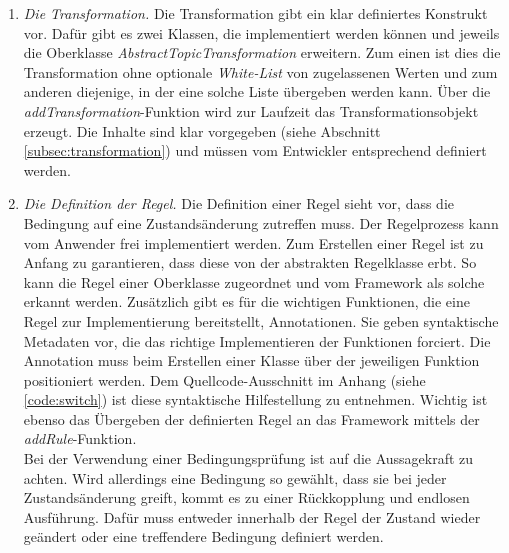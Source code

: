 \begin{enumerate}
            \pagebreak
            \item \textit{Die Transformation.}
            Die Transformation gibt ein klar definiertes Konstrukt vor. Dafür gibt es zwei Klassen, die implementiert werden können und 
            jeweils die Oberklasse \textit{AbstractTopicTransformation} erweitern. Zum einen ist dies die Transformation ohne 
            optionale \textit{White-List} von zugelassenen Werten und zum anderen diejenige, in der eine solche Liste übergeben werden kann. Über die 
            \textit{addTransformation}-Funktion wird zur Laufzeit das Transformationsobjekt erzeugt. Die Inhalte sind klar vorgegeben (siehe Abschnitt \ref{subsec:transformation}) 
            und müssen vom Entwickler entsprechend definiert werden.
            \item \textit{Die Definition der Regel.} 
            Die Definition einer Regel sieht vor, dass die Bedingung auf eine Zustandsänderung zutreffen muss. Der Regelprozess kann vom Anwender 
            frei implementiert werden. Zum Erstellen einer Regel ist zu Anfang zu garantieren, dass diese von der abstrakten Regelklasse erbt. So kann die Regel einer 
            Oberklasse zugeordnet und vom Framework als solche erkannt werden. Zusätzlich gibt es für die wichtigen Funktionen, die eine Regel zur 
            Implementierung bereitstellt, Annotationen. Sie geben syntaktische Metadaten vor, die das richtige Implementieren der Funktionen forciert. Die 
            Annotation muss beim Erstellen einer Klasse über der jeweiligen Funktion positioniert werden. Dem Quellcode-Ausschnitt im Anhang (siehe \ref{code:switch}) ist diese 
            syntaktische Hilfestellung zu entnehmen. Wichtig ist ebenso das Übergeben der definierten Regel an das Framework mittels der \textit{addRule}-Funktion. 
            \\
            Bei der Verwendung einer Bedingungsprüfung ist auf die Aussagekraft zu achten. Wird allerdings eine Bedingung so gewählt, dass sie bei jeder Zustandsänderung greift, kommt 
            es zu einer Rückkopplung und endlosen Ausführung. Dafür muss entweder innerhalb der Regel der Zustand wieder geändert oder eine treffendere Bedingung definiert werden.
        \end{enumerate}
